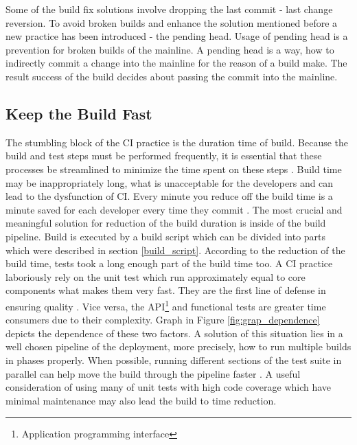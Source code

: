 Some of the build fix solutions involve dropping the last commit - last change reversion. To avoid broken builds and enhance the solution mentioned before a new practice has been introduced - the pending head. Usage of pending head is a prevention for broken builds of the mainline. A pending head is a way, how to indirectly commit a change into the mainline for the reason of a build make. The result success of the build decides about passing the commit into the mainline.

\subsection{Keep the Build Fast}

The stumbling block of the CI practice is the duration time of build. Because the build and test steps must be performed frequently, it is essential that these processes be streamlined to minimize the time spent on these steps \cite{DigitalOceanCI}. Build time may be inappropriately long, what is unacceptable for the developers and can lead to the dysfunction of CI. Every minute you reduce off the build time is a minute saved for each developer every time they commit \cite{MartinFowler}. The most crucial and meaningful solution for reduction of the build duration is inside of the build pipeline. Build is executed by a build script which can be divided into parts which were described in section \ref{build_script}. According to the reduction of the build time, tests took a long enough part of the build time too. A CI practice laboriously rely on the unit test which run approximately equal to core components what makes them very fast. They are the first line of defense in ensuring quality \cite{CI_atlassian}. Vice versa, the API\footnote{Application programming interface} and functional tests are greater time consumers due to their complexity. Graph in Figure \ref{fig:grap_dependence} depicts the dependence of these two factors. A solution of this situation lies in a well chosen pipeline of the deployment, more  precisely, how to run multiple builds in phases properly. When possible, running different sections of the test suite in parallel can help move the build through the pipeline faster \cite{DigitalOceanCI}. A useful consideration of using many of unit tests with high code coverage which have minimal maintenance may also lead the build to time reduction.

